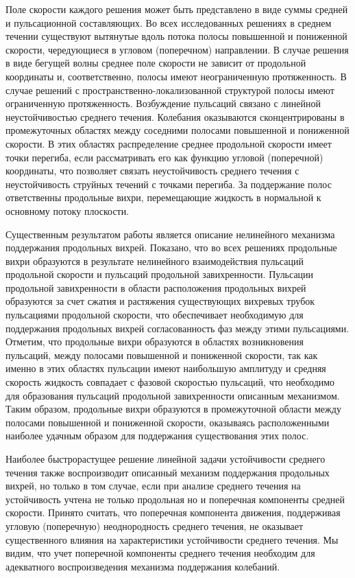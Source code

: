 Поле скорости каждого решения может быть представлено в виде суммы средней и пульсационной составляющих. Во всех исследованных решениях в среднем течении существуют вытянутые вдоль потока полосы повышенной и пониженной скорости, чередующиеся в угловом (поперечном) направлении. В случае решения в виде бегущей волны среднее поле скорости не зависит от продольной координаты и, соответственно, полосы имеют неограниченную протяженность. В случае решений с пространственно-локализованной структурой полосы имеют ограниченную протяженность. Возбуждение пульсаций связано с линейной неустойчивостью среднего течения. Колебания оказываются сконцентрированы в промежуточных областях между соседними полосами повышенной и пониженной скорости. В этих областях распределение среднее продольной скорости имеет точки перегиба, если рассматривать его как функцию угловой (поперечной) координаты, что позволяет связать неустойчивость среднего течения с неустойчивость струйных течений с точками перегиба. За поддержание полос ответственны продольные вихри, перемещающие жидкость в нормальной к основному потоку плоскости. 

Существенным результатом работы является описание нелинейного механизма поддержания продольных вихрей. Показано, что во всех решениях продольные вихри образуются в результате нелинейного взаимодействия пульсаций продольной скорости и пульсаций продольной завихренности. Пульсации продольной завихренности в области расположения продольных вихрей образуются за счет сжатия и растяжения существующих вихревых трубок пульсациями продольной скорости, что обеспечивает необходимую для поддержания продольных вихрей согласованность фаз между этими пульсациями. Отметим, что продольные вихри образуются в областях возникновения пульсаций, между полосами повышенной и пониженной скорости, так как именно в этих областях пульсации имеют наибольшую амплитуду и средняя скорость жидкость совпадает с фазовой скоростью пульсаций, что необходимо для образования пульсаций продольной завихренности описанным механизмом. Таким образом, продольные вихри образуются в промежуточной области между полосами повышенной и пониженной скорости, оказываясь расположенными наиболее удачным образом для поддержания существования этих полос. 

Наиболее быстрорастущее решение линейной задачи устойчивости среднего течения также воспроизводит описанный механизм поддержания продольных вихрей, но только в том случае, если при анализе среднего течения на устойчивость учтена не только продольная но и поперечная компоненты средней скорости. Принято считать, что поперечная компонента движения, поддерживая угловую (поперечную) неоднородность среднего течения, не оказывает существенного влияния на характеристики устойчивости среднего течения. Мы видим, что учет поперечной компоненты среднего течения необходим для адекватного воспроизведения механизма поддержания колебаний. 

